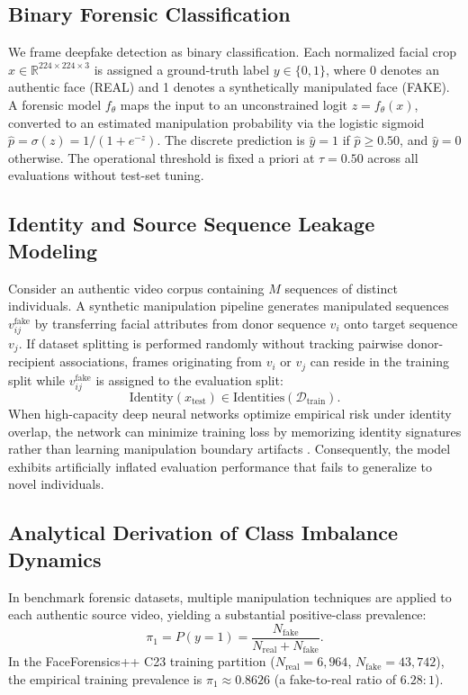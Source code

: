 \documentclass[conference]{IEEEtran}
\begin{document}
\subsection{Binary Forensic Classification}

We frame deepfake detection as binary classification. Each normalized facial crop $x \in \mathbb{R}^{224 \times 224 \times 3}$ is assigned a ground-truth label $y \in \{0, 1\}$, where 0 denotes an authentic face (REAL) and 1 denotes a synthetically manipulated face (FAKE). A forensic model $f_\theta$ maps the input to an unconstrained logit $z = f_\theta(x)$, converted to an estimated manipulation probability via the logistic sigmoid $\hat{p} = \sigma(z) = 1/(1+e^{-z})$. The discrete prediction is $\hat{y} = 1$ if $\hat{p} \ge 0.50$, and $\hat{y} = 0$ otherwise. The operational threshold is fixed a priori at $\tau = 0.50$ across all evaluations without test-set tuning.

\subsection{Identity and Source Sequence Leakage Modeling}

Consider an authentic video corpus containing $M$ sequences of distinct individuals. A synthetic manipulation pipeline generates manipulated sequences $v_{ij}^{\text{fake}}$ by transferring facial attributes from donor sequence $v_i$ onto target sequence $v_j$. If dataset splitting is performed randomly without tracking pairwise donor-recipient associations, frames originating from $v_i$ or $v_j$ can reside in the training split while $v_{ij}^{\text{fake}}$ is assigned to the evaluation split:
\begin{equation}
\text{Identity}(x_{\text{test}}) \in \text{Identities}(\mathcal{D}_{\text{train}}).
\end{equation}
When high-capacity deep neural networks optimize empirical risk under identity overlap, the network can minimize training loss by memorizing identity signatures rather than learning manipulation boundary artifacts \cite{dong2023implicit}. Consequently, the model exhibits artificially inflated evaluation performance that fails to generalize to novel individuals.

\subsection{Analytical Derivation of Class Imbalance Dynamics}

In benchmark forensic datasets, multiple manipulation techniques are applied to each authentic source video, yielding a substantial positive-class prevalence:
\begin{equation}
\pi_1 = P(y = 1) = \frac{N_{\text{fake}}}{N_{\text{real}} + N_{\text{fake}}}.
\end{equation}
In the FaceForensics++ C23 training partition ($N_{\text{real}} = 6,964$, $N_{\text{fake}} = 43,742$), the empirical training prevalence is $\pi_1 \approx 0.8626$ (a fake-to-real ratio of $6.28:1$).
\end{document}

